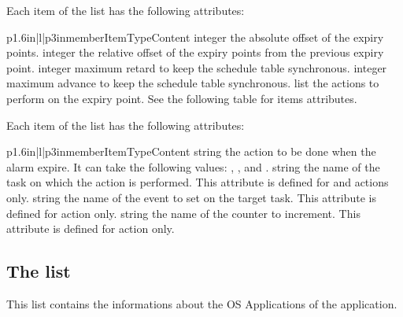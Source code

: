 Each item of the  list has the following attributes:

\begin{longtableiii}{p{1.6in}|l|p{3in}}{member}{Item}{Type}{Content}
  {integer}
  {the absolute offset of the expiry points.}
  {integer}
  {the relative offset of the expiry points from the previous expiry point.}
  {integer}
  {maximum retard to keep the schedule table synchronous.}
  {integer}
  {maximum advance to keep the schedule table synchronous.}
  {list}
  {the actions to perform on the expiry point. See the following table for items attributes.}
\end{longtableiii}

Each item of the  list has the following attributes:

\begin{longtableiii}{p{1.6in}|l|p{3in}}{member}{Item}{Type}{Content}
  {string}
  {the action to be done when the alarm expire. It can take the following values: , ,  and .}
  {string}
  {the name of the task on which the action is performed. This attribute is defined for  and  actions only.}
  {string}
  {the name of the event to set on the target task. This attribute is defined for  action only.}
  {string}
  {the name of the counter to increment. This attribute is defined for  action only.}
\end{longtableiii}

\subsection{The  list}

This list contains the informations about the OS Applications of the application.

